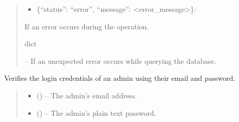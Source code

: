 \documentclass[letterpaper,10pt,english]{sphinxmanual}
\begin{document}
\begin{fulllineitems}
\begin{fulllineitems}
\begin{quote}
\begin{description}
\begin{description}
\begin{description}
\end{description}
\begin{itemize}
\item {} 
\sphinxAtStartPar
\{“status”: “error”, “message”: <error\_message>\}:

\end{itemize}

\sphinxAtStartPar
If an error occurs during the operation.

\end{description}


\sphinxAtStartPar
dict

\sphinxAtStartPar
{} – If an unexpected error occurs while querying the database.

\end{description}\end{quote}

\end{fulllineitems}


\begin{fulllineitems}
\label{\detokenize{app.controllers:app.controllers.admin_controller.AdminController.loginAdmin}}
\pysigstartsignatures
\pysiglinewithargsret
{}
{\sphinxparamcomma {}\sphinxparamcomma {}}
{}
\pysigstopsignatures
\sphinxAtStartPar
Verifies the login credentials of an admin using their email and password.
\begin{quote}\begin{description}
\begin{itemize}
\item {} 
\sphinxAtStartPar
{} () – The admin’s email address.

\item {} 
\sphinxAtStartPar
{} () – The admin’s plain text password.


\end{itemize}
\end{description}
\end{quote}
\end{fulllineitems}
\end{fulllineitems}
\end{document}
